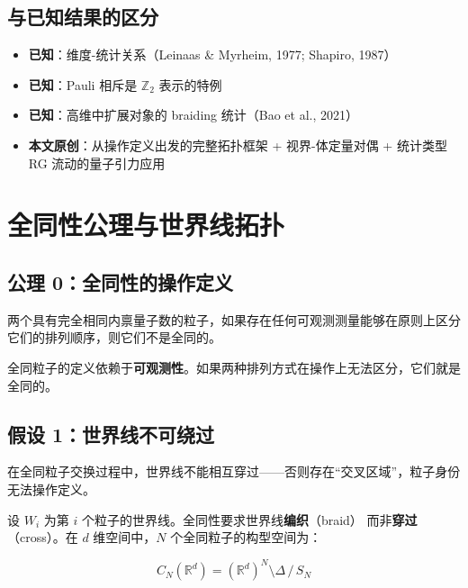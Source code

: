 \documentclass[11pt,a4paper]{article}
\begin{document}
\subsection{与已知结果的区分}

\begin{itemize}
\item \textbf{已知}：维度-统计关系（Leinaas \& Myrheim, 1977; Shapiro, 1987）
\item \textbf{已知}：Pauli 相斥是 $\mathbb{Z}_2$ 表示的特例
\item \textbf{已知}：高维中扩展对象的 braiding 统计（Bao et al., 2021）
\item \textbf{本文原创}：从操作定义出发的完整拓扑框架 + 视界-体定量对偶 +
统计类型 RG 流动的量子引力应用
\end{itemize}

\section{全同性公理与世界线拓扑}

\subsection{公理 0：全同性的操作定义}

\begin{definition}[全同性操作定义]
两个具有完全相同内禀量子数的粒子，如果存在任何可观测测量能够在原则上区分它们的排列顺序，则它们不是全同的。
\end{definition}

\begin{proposition}
全同粒子的定义依赖于\textbf{可观测性}。如果两种排列方式在操作上无法区分，它们就是全同的。
\end{proposition}

\subsection{假设 1：世界线不可绕过}

\begin{assumption}[世界线不可绕过]
在全同粒子交换过程中，世界线不能相互穿过——否则存在``交叉区域''，粒子身份无法操作定义。
\end{assumption}

设 $W_i$ 为第 $i$ 个粒子的世界线。全同性要求世界线\textbf{编织}（braid）
而非\textbf{穿过}（cross）。在 $d$ 维空间中，$N$ 个全同粒子的构型空间为：

\begin{equation}
C_N(\mathbb{R}^d) = (\mathbb{R}^d)^N \setminus \Delta \,/\, S_N
\end{equation}
\end{document}
